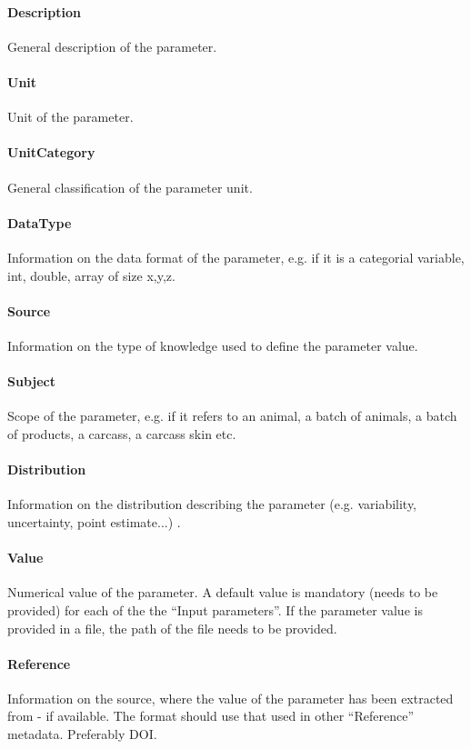 \documentclass[a4paper]{report}
\begin{document}
\paragraph{Description}
General description of the parameter.

\paragraph{Unit}
Unit of the parameter.

\paragraph{UnitCategory}
General classification of the parameter unit.

\paragraph{DataType}
Information on the data format of the parameter, e.g. if it is a categorial variable, int, double, array of size x,y,z.

\paragraph{Source}
Information on the type of knowledge used to define the parameter value.

\paragraph{Subject}
Scope of the parameter, e.g. if it refers to an animal, a batch of animals, a batch of products, a carcass, a carcass skin etc.

\paragraph{Distribution}
Information on the distribution describing the parameter (e.g. variability, uncertainty, point estimate...) .

\paragraph{Value}
Numerical value of the parameter. A default value is mandatory (needs to be provided) for each of the the ``Input parameters''. If the parameter value is provided in a file, the path of the file needs to be provided.

\paragraph{Reference}
Information on the source, where the value of the parameter has been extracted from - if available. The format should use that used in other ``Reference'' metadata. Preferably DOI.
\end{document}
